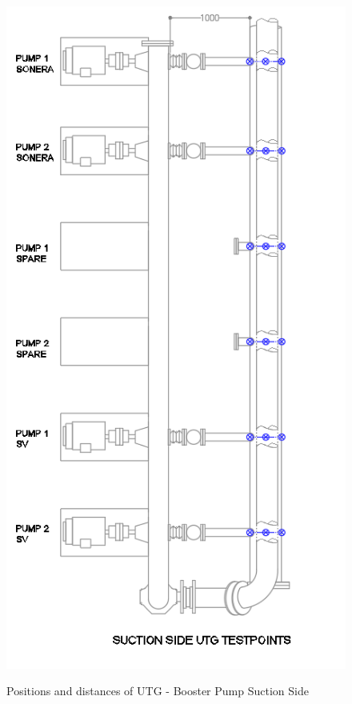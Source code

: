 \begin{table}[h]
{	}
\end{table}





\begin{figure}[!htb]
\includegraphics[scale=0.6, angle=90]{figures/ch04_fig_utgbp} \\
\caption{Positions and distances of UTG - Booster Pump Suction Side}
\label{ch04_fig_utgbp} 
\end{figure}

